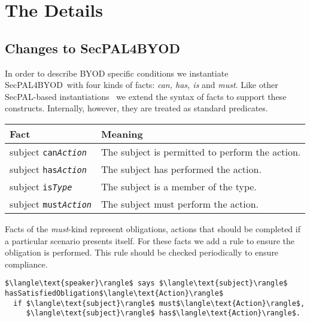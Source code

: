 \documentclass{llncs}
\newcommand{\AppPAL}[0]{SecPAL4BYOD}
\begin{document}
\section{The Details}
\label{sec:details}

\subsection{Changes to \AppPAL}

In order to describe BYOD specific conditions we instantiate \AppPAL~with four kinds of facts: \emph{can, has, is} and \emph{must}.
Like other SecPAL-based instantiations~\cite{becker_framework_2009,aziz_secpal4dsa:_2011} we extend the syntax of facts to support these constructs.
Internally, however, they are treated as standard predicates.

\begin{center}
  \footnotesize\sffamily
  \newcommand{\predicate}[3]{#1 \texttt{#2\textit{#3}}}
  \begin{tabular}{l l}
    \toprule
    Fact                              & Meaning                                         \\
    \midrule
    \predicate{subject}{can}{Action}  & The subject is permitted to perform the action. \\
    \predicate{subject}{has}{Action}  & The subject has performed the action.           \\
    \predicate{subject}{is}{Type}     & The subject is a member of the type.            \\
    \predicate{subject}{must}{Action} & The subject must perform the action.            \\
    \bottomrule
  \end{tabular}
\end{center}

Facts of the \emph{must}-kind represent obligations, actions that should be completed if a particular scenario presents itself.
For these facts we add a rule to ensure the obligation is performed.
This rule should be checked periodically to ensure compliance.
\begin{lstlisting}
$\langle\text{speaker}\rangle$ says $\langle\text{subject}\rangle$ hasSatisfiedObligation$\langle\text{Action}\rangle$
  if $\langle\text{subject}\rangle$ must$\langle\text{Action}\rangle$,
     $\langle\text{subject}\rangle$ has$\langle\text{Action}\rangle$.
\end{lstlisting}
\end{document}
